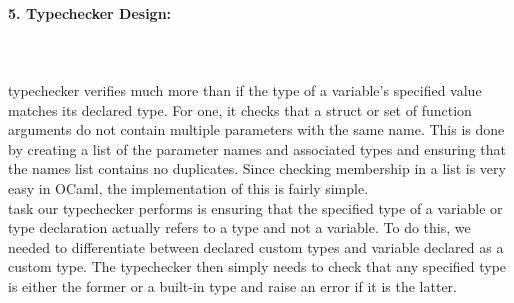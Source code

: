 \documentclass{article}
\begin{document}
\paragraph{5. Typechecker Design:}\mbox{}\\\\
 typechecker verifies much more than if the type of a variable's specified value matches its declared type. For one, it checks that a struct or set of function arguments do not contain multiple parameters with the same name. This is done by creating a list of the parameter names and associated types and ensuring that the names list contains no duplicates. Since checking membership in a list is very easy in OCaml, the implementation of this is fairly simple.\\
 task our typechecker performs is ensuring that the specified type of a variable or type declaration actually refers to a type and not a variable. To do this, we needed to differentiate between declared custom types and variable declared as a custom type. The typechecker then simply needs to check that any specified type is either the former or a built-in type and raise an error if it is the latter.
\end{document}
